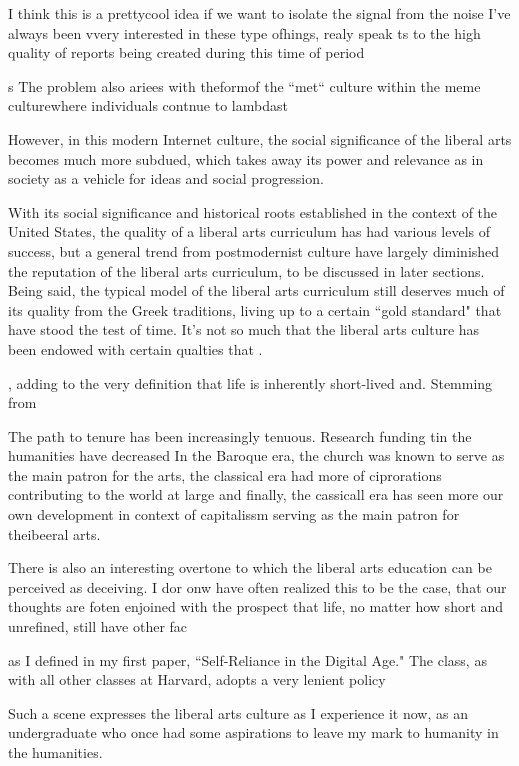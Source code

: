\documentclass[12pt,letterpaper]{article}
\begin{document}
I think this is a prettycool idea if we want to isolate the signal from the noise  I've always been vvery interested in these type ofhings, realy speak ts to the high quality  of reports being created during this time of period


s
The problem also ariees with theformof the ``met`` culture within  the meme culturewhere individuals contnue to lambdast 

However, in this modern Internet culture, the social significance of the liberal arts becomes much more subdued, which takes away its power and relevance as in society as a vehicle for ideas and social progression.

With its social significance and historical roots established in the context of the United States, the quality of a liberal arts curriculum has had various levels of success, but a general trend from postmodernist culture have largely diminished the reputation of the liberal arts curriculum, to be discussed in later sections.  Being said, the typical model of the liberal arts curriculum still deserves much of its quality from the Greek traditions, living up to a certain ``gold standard" that have stood the test of time.  It's not so much that the liberal arts culture has been endowed with certain qualties that .

, adding to the very definition that life is inherently short-lived and.  Stemming from 

The path to tenure has been increasingly tenuous.  Research funding tin the humanities have decreased In the Baroque era, the church was known to serve as the main patron for the arts, the classical era had more of ciprorations contributing to the world at large and finally, the cassicall era has seen more our own development in context of capitalissm serving as the main patron for theibeeral arts.



There is also an interesting overtone to which the liberal arts education can be perceived as deceiving.  I dor onw have often realized this to be the case, that our thoughts are foten enjoined with the prospect that life, no matter how short and unrefined, still  have other fac

as I defined in my first paper, ``Self-Reliance in the Digital Age."  The class, as with all other classes at Harvard, adopts a very lenient policy

Such a scene expresses the liberal arts culture as I experience it now, as an undergraduate who once had some aspirations to leave my mark to humanity in the humanities.   
\end{document}
